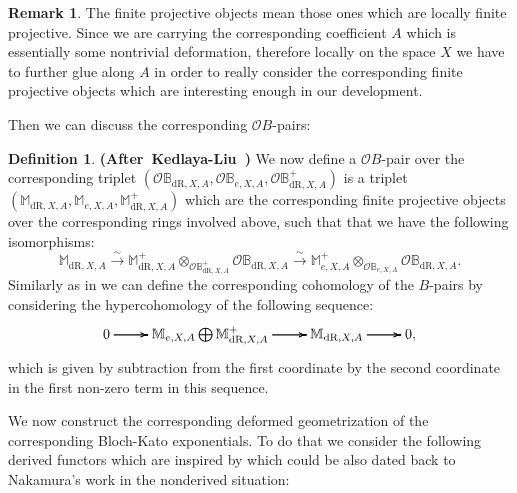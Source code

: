 \documentclass[12pt]{amsart}
\theoremstyle{definition}
\newtheorem{definition}[theorem]{Definition}
\newtheorem{remark}[theorem]{Remark}
\numberwithin{equation}{section}
\begin{document}
\begin{remark}
The finite projective objects mean those ones which are locally finite projective. Since we are carrying the corresponding coefficient $A$ which is essentially some nontrivial deformation, therefore locally on the space $X$ we have to further glue along $A$ in order to really consider the corresponding finite projective objects which are interesting enough in our development.\\	
\end{remark}

	


\indent Then we can discuss the corresponding $\mathcal{O}B$-pairs:

\begin{definition} \mbox{\bf{(After Kedlaya-Liu \cite[Definition 9.3.11]{KL15})}}
	We now define a $\mathcal{O}B$-pair over the corresponding triplet $(\mathcal{O}\mathbb{B}_{\mathrm{dR},X,A}, \mathcal{O}\mathbb{B}_{e,X,A}, \mathcal{O}\mathbb{B}^+_{\mathrm{dR},X,A})$ is a triplet $(\mathbb{M}_{\mathrm{dR},X,A}, \mathbb{M}_{e,X,A}, \mathbb{M}^+_{\mathrm{dR},X,A})$ which are the corresponding finite projective objects over the corresponding rings involved above, such that that we have the following isomorphisms:
\begin{displaymath}
\mathbb{M}_{\mathrm{dR},X,A}\overset{\sim}{\longrightarrow}\mathbb{M}_{\mathrm{dR},X,A}^+\otimes_{\mathcal{O}\mathbb{B}^+_{\mathrm{dR},X,A}}\mathcal{O}\mathbb{B}_{\mathrm{dR},X,A}\overset{\sim}{\longrightarrow}\mathbb{M}_{e,X,A}^+\otimes_{\mathcal{O}\mathbb{B}_{e,X,A}} \mathcal{O}\mathbb{B}_{\mathrm{dR},X,A}.
\end{displaymath}
Similarly as in \cite[Definition 9.4.4]{KL15} we can define the corresponding cohomology of the $B$-pairs by considering the hypercohomology of the following sequence:
\[
\xymatrix@R+0pc@C+0pc{
0\ar[r] \ar[r] \ar[r] &\mathbb{M}_{e,X,A}\bigoplus \mathbb{M}^+_{\mathrm{dR},X,A}    \ar[r] \ar[r] \ar[r]  &\mathbb{M}_{\mathrm{dR},X,A} \ar[r] \ar[r] \ar[r] &0,
}
\]
which is given by subtraction from the first coordinate by the second coordinate in the first non-zero term in this sequence.

\end{definition}



We now construct the corresponding deformed geometrization of the corresponding Bloch-Kato exponentials. To do that we consider the following derived functors which are inspired by \cite[Theorem 1.5]{LZ} which could be also dated back to Nakamura's work \cite[2.1]{Nakamura2} in the nonderived situation:
\end{document}
